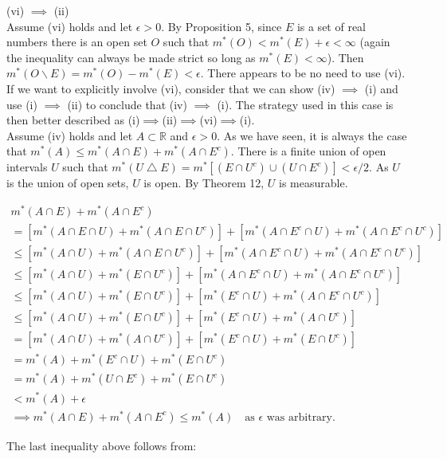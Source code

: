 \documentclass[a4paper]{article}
\begin{document}
(vi) $\implies$ (ii)\\
Assume (vi) holds and let $\epsilon > 0$. By Proposition 5, since $E$ is a set of real numbers there is an open set $O$ such that $m^*(O) < m^*(E) + \epsilon < \infty$ (again the inequality can always be made strict so long as $m^*(E) < \infty$). Then $m^*(O\backslash E) = m^*(O) - m^*(E) < \epsilon$. There appears to be no need to use (vi). If we want to explicitly involve (vi), consider that we can show (iv) $\implies$ (i) and use (i) $\implies$ (ii) to conclude that (iv) $\implies$ (i). The strategy used in this case is then better described as (i)$\implies$(ii)$\implies$(vi)$\implies$(i).\\

Assume (iv) holds and let $A \subset \mathbb{R}$ and $\epsilon > 0$. As we have seen, it is always the case that $m^*(A) \leq m^*(A \cap E) + m^*(A \cap E^c)$. There is a finite union of open intervals $U$ such that $m^*(U \bigtriangleup E)  = m^*\left[(E\cap U^c)\cup (U \cap E^c)\right] < \epsilon / 2$. As $U$ is the union of open sets, $U$ is open. By Theorem 12, $U$ is measurable.

\begin{align*}
m^*(A\cap E) + m^*(A \cap E^c) &\\
= [m^*(A\cap E \cap U) + m^*(A \cap E \cap U^c)]
+ [m^*(A\cap E^c \cap U) + m^*(A \cap E^c \cap U^c)]& \\
 \leq [m^*(A \cap U) + m^*(A \cap E \cap U^c)] + [m^*(A\cap E^c \cap U) + m^*(A \cap E^c \cap U^c)]&\\
 \leq [m^*(A \cap U) + m^*(E \cap U^c)] + [m^*(A\cap E^c \cap U) + m^*(A \cap E^c \cap U^c)]&\\
 \leq [m^*(A \cap U) + m^*(E \cap U^c)] + [m^*(E^c \cap U) + m^*(A \cap E^c \cap U^c)]&\\
 \leq [m^*(A \cap U) + m^*(E \cap U^c)] + [m^*(E^c \cap U) + m^*(A \cap U^c)] &\\
= [m^*(A \cap U) + m^*(A \cap U^c)] + [m^*(E^c \cap U) + m^*(E \cap U^c)]& \\
 = m^*(A) + m^*(E^c \cap U) + m^*(E \cap U^c) &\\
= m^*(A) + m^*(U\cap E^c) + m^*(E \cap U^c)&\\
< m^*(A) + \epsilon & \\
\implies m^*(A\cap E) + m^*(A \cap E^c) \leq m^*(A) \quad \text{as } \epsilon \text{ was arbitrary}. &
\end{align*}

The last inequality above follows from:
\end{document}
